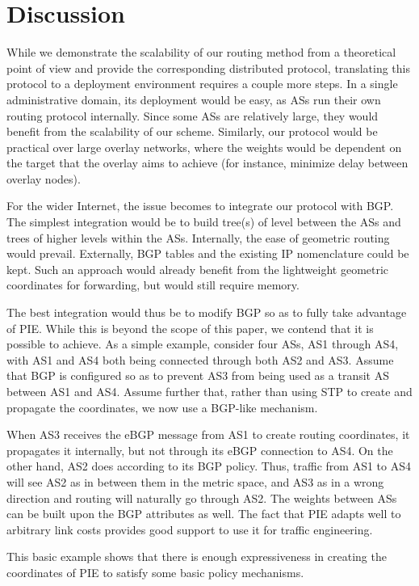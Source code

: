 \documentclass[conference]{IEEEtran}
\begin{document}
\section{Discussion}
\label{sec:discussion}
While we demonstrate the scalability of our routing method from a
theoretical point of view and provide the corresponding distributed protocol,
translating this protocol to a deployment environment requires a couple
more steps.
In a single administrative domain, its deployment would be
easy, as ASs run their own routing protocol internally. Since some ASs
are relatively large, they would benefit from the scalability of our
scheme.
Similarly, our protocol would be practical over large overlay
networks, where the weights would be dependent on the target that the
overlay aims to achieve (for instance, minimize delay between overlay nodes).

For the wider Internet, the issue becomes to integrate our protocol
with BGP.
The simplest integration would be to build tree(s) of level  between the ASs and trees of higher levels within the ASs. Internally, the ease of geometric routing would prevail. Externally, BGP tables and the existing IP nomenclature could be kept. Such an approach would already benefit from the lightweight geometric coordinates for forwarding, but would still require  memory.




The best integration would thus be to modify BGP so as to fully take
advantage of PIE. While this is beyond the scope of this paper, we
contend that it is possible to achieve. As a simple example, consider four
ASs, AS1 through AS4, with AS1 and AS4 both being connected through
both AS2 and AS3. Assume that BGP is configured so as to prevent AS3
from being used as a transit AS between AS1 and AS4. Assume further
that, rather than using STP to create and propagate the coordinates,
we now use a BGP-like mechanism.

When AS3 receives the eBGP message from AS1 to create routing
coordinates, it propagates it internally, but not through its eBGP
connection to AS4. On the other hand, AS2 does according to its BGP
policy. Thus, traffic from AS1 to AS4 will see AS2 as in between them in the metric space,
and AS3 as in a wrong direction and routing will naturally go through
AS2. The weights between ASs can be built upon the BGP attributes
as well.
The fact that PIE adapts well to arbitrary link costs
provides good support to use it for traffic engineering.

This basic example shows that there is enough expressiveness in
creating the coordinates of PIE to satisfy some basic policy
mechanisms.
\end{document}
